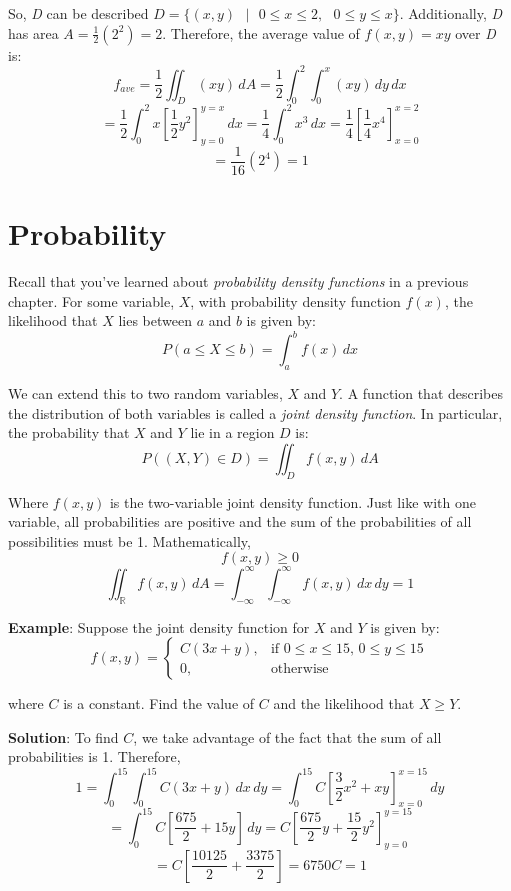 \begin{Answer}[ref = avg]
\begin{enumerate}
So, \textit{D} can be described $\textit{D} = \{(x, y)\text{ }|\text{ }0 \leq 
x \leq 2,\text{ }0 \leq y \leq x\}$. Additionally, \textit{D} has area $A = 
\frac{1}{2} \left( 2^2 \right) = 2$. Therefore, the average value of $f(x,y) = 
xy$ over \textit{D} is:
$$f_{ave} = \frac{1}{2} \iint_{\textit{D}} \left(xy \right)\,dA = \frac{1}{2} 
\int_0^2 \int_0^x \left(xy \right)\,dy\,dx$$
$$= \frac{1}{2} \int_0^2 x \left[ \frac{1}{2}y^2 \right]_{y = 0}^{y = x}\,dx = 
\frac{1}{4} \int_0^2 x^3\,dx = \frac{1}{4} \left[ \frac{1}{4}x^4 \right]_{x = 0
}^{x = 2}$$
$$= \frac{1}{16} \left(2^4 \right) = 1$$
\end{enumerate}
\end{Answer}

\section{Probability}
Recall that you've learned about \textit{probability density functions} in a 
previous chapter. For some variable, $X$, with probability density function 
$f(x)$, the likelihood that $X$ lies between $a$ and $b$ is given by:
$$P(a \leq X \leq b) = \int_a^b f(x)\,dx$$

We can extend this to two random variables, $X$ and $Y$. A function that 
describes the distribution of both variables is called a \textit{joint 
density function}. In particular, the probability
that $X$ and $Y$ lie in a region $D$ is:
$$P((X, Y) \in D) = \iint_{\textit{D}} f(x,y)\,dA$$

Where $f(x, y)$ is the two-variable joint density function. Just like with one 
variable, all probabilities are positive and the sum of the probabilities of 
all possibilities must be 1. Mathematically, 
$$f(x, y) \geq 0$$
$$\iint_{\mathbb{R}} f(x, y)\,dA = \int_{-\infty}^{\infty} \int_{-\infty}^{
\infty} f(x, y)\,dx\,dy = 1$$

\textbf{Example}: Suppose the joint density function for $X$ and $Y$ is given 
by:
$$f(x, y) = 
\begin{cases}
C(3x + y),& \text{if }0 \leq x \leq 15\text{, }0 \leq y \leq 15\\
0,&\text{otherwise}
\end{cases}
$$

where $C$ is a constant. Find the value of $C$ and the likelihood that $X \geq 
Y$.

\textbf{Solution}: To find $C$, we take advantage of the fact that the sum of 
all probabilities is 1. Therefore,
$$1 = \int_0^{15} \int_0^{15} C(3x + y)\,dx\,dy = \int_0^{15} C \left[ \frac{3
}{2}x^2 + xy \right]_{x = 0}^{x = 15}\,dy$$
$$= \int_0^{15} C \left[ \frac{675}{2} + 15y \right]\,dy = C \left[ \frac{675}{
2}y + \frac{15}{2}y^2 \right]_{y = 0}^{y = 15}$$
$$= C \left[ \frac{10125}{2} + \frac{3375}{2} \right] = 6750C = 1$$

